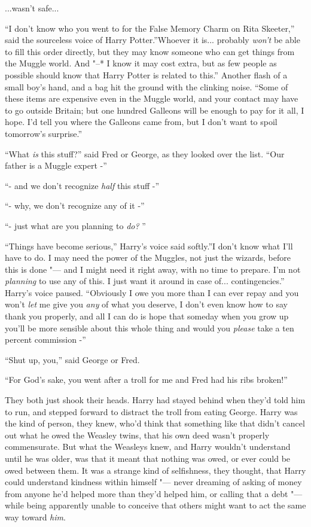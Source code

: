 ...wasn't safe...

``I don't know who you went to for the False Memory Charm on Rita
Skeeter,'' said the sourceless voice of Harry Potter.''Whoever it
is... probably \emph{won't} be able to fill this order directly,
but they may know someone who can get things from the Muggle world. And
"--* I know it may cost extra, but as few people as possible should know
that Harry Potter is related to this.'' Another flash of a small boy's
hand, and a bag hit the ground with the clinking noise. ``Some of these
items are expensive even in the Muggle world, and your contact may have
to go outside Britain; but one hundred Galleons will be enough to pay
for it all, I hope. I'd tell you where the Galleons came from, but I
don't want to spoil tomorrow's surprise.''

``What \emph{is} this stuff?'' said Fred or George, as they looked over
the list. ``Our father is a Muggle expert -''

``- and we don't recognize \emph{half} this stuff -''

``- why, we don't recognize any of it -''

``- just what are you planning to \emph{do?} ''

``Things have become serious,'' Harry's voice said softly.''I don't know
what I'll have to do. I may need the power of the Muggles, not just the
wizards, before this is done "--- and I might need it right away, with no
time to prepare. I'm not \emph{planning} to use any of this. I just want
it around in case of... contingencies.'' Harry's voice paused.
``Obviously I owe you more than I can ever repay and you won't \emph{let}
me give you \emph{any} of what you deserve, I don't even know how to say
thank you properly, and all I can do is hope that someday when you grow
up you'll be more sensible about this whole thing and would you
\emph{please} take a ten percent commission -''

``Shut up, you,'' said George or Fred.

``For God's sake, you went after a troll for me and Fred had his ribs
broken!''

They both just shook their heads. Harry had stayed behind when they'd
told him to run, and stepped forward to distract the troll from eating
George. Harry was the kind of person, they knew, who'd think that
something like that didn't cancel out what he owed the Weasley twins,
that his own deed wasn't properly commensurate. But what the Weasleys
knew, and Harry wouldn't understand until he was older, was that it
meant that nothing was owed, or ever could be owed between them. It was
a strange kind of selfishness, they thought, that Harry could understand
kindness within himself "--- never dreaming of asking of money from anyone
he'd helped more than they'd helped him, or calling that a debt "--- while
being apparently unable to conceive that others might want to act the
same way toward \emph{him}.

